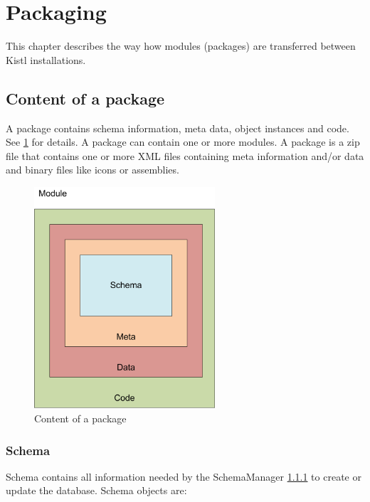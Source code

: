 \section{\label{Packaging}Packaging}
This chapter describes the way how modules (packages) are transferred between Kistl installations.

\subsection{\label{Packaging_Content_of_a_package}Content of a package}

A package contains schema information, meta data, object instances and code. See \ref{content_of_package} for details. 
A package can contain one or more modules. A package is a zip file that contains one or more XML files containing meta information and/or data and binary files like icons or assemblies.

\begin{figure}[ht]
	\begin{center}
		\includegraphics[width=0.6\textwidth]{images/content_of_package.png}
		\caption{Content of a package}
		\label{content_of_package}
	\end{center}
\end{figure}

\subsubsection{\label{Packaging_Schema}Schema}

Schema contains all information needed by the SchemaManager \ref{} to create or update the database. Schema objects are:

